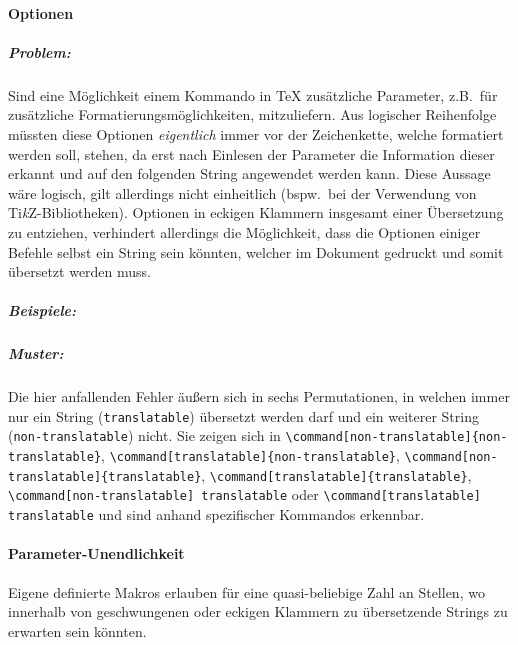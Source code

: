 
\paragraph*{Optionen}\par
\subparagraph*{Problem:}\par
Sind eine Möglichkeit einem Kommando in \TeX{} zusätzliche Parameter, z.B.\ für zusätzliche Formatierungsmöglichkeiten, mitzuliefern. Aus logischer Reihenfolge müssten diese Optionen \textit{eigentlich} immer vor der Zeichenkette, welche formatiert werden soll, stehen, da erst nach Einlesen der Parameter die Information dieser erkannt und auf den folgenden String angewendet werden kann.%
Diese Aussage wäre logisch, gilt allerdings nicht einheitlich (bspw.\ bei der Verwendung von Ti\textit{k}Z-Bibliotheken). Optionen in eckigen Klammern insgesamt einer Übersetzung zu entziehen, verhindert allerdings die Möglichkeit, dass die Optionen einiger Befehle selbst ein String sein könnten, welcher im Dokument gedruckt und somit übersetzt werden muss.  
\subparagraph*{Beispiele:}\par
\subparagraph*{Muster:}\par
Die hier anfallenden Fehler äußern sich in sechs Permutationen, in welchen immer nur ein String (\texttt{translatable}) übersetzt werden darf und ein weiterer String  (\texttt{non-translatable}) nicht. Sie zeigen sich in \verb|\command[non-translatable]{non-translatable}|, \verb|\command[translatable]{non-translatable}|, \verb|\command[non-translatable]{translatable}|, \verb|\command[translatable]{translatable}|, \verb|\command[non-translatable] translatable| oder \verb|\command[translatable] translatable|  und sind anhand spezifischer Kommandos erkennbar.


\paragraph*{Parameter-Unendlichkeit}
Eigene definierte Makros erlauben für eine quasi-beliebige Zahl an Stellen, wo innerhalb von geschwungenen oder eckigen Klammern zu übersetzende Strings zu erwarten sein könnten.%

